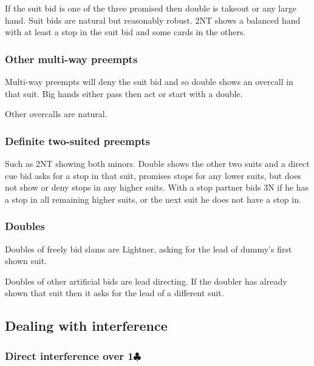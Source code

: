 \documentclass[a4paper,14pt]{extarticle}
\begin{document}
If the suit bid is one of the three promised then double is takeout or any large hand.
Suit bids are natural but reasonably robust. 2NT shows a balanced hand with at 
least a stop in the suit bid and some cards in the others.

\subsubsection{Other multi-way preempts}

Multi-way preempts will deny the suit bid and so double shows an overcall in
that suit. Big hands either pass then act or start with a double.

Other overcalls are natural.

\subsubsection{Definite two-suited preempts}

Such as 2NT showing both minors. Double shows the other two suits and a direct
cue bid asks for a stop in that suit, promises stops for any lower suits, but
does not show or deny stops in any higher suits. With a stop partner bids 3N if
he has a stop in all remaining higher suits, or the next suit he does not have
a stop in.

\subsubsection{Doubles}
\label{sec:def:doubles}

Doubles of freely bid slams are Lightner, asking for the lead of dummy's first shown suit.

Doubles of other artificial bids are lead directing. If the doubler has already shown that
suit then it asks for the lead of a different suit.

\newpage

\subsection{Dealing with interference}
\label{sec:interference}

\subsubsection{Direct interference over 1$\clubsuit$}
\label{sec:intf:1c}
\end{document}
